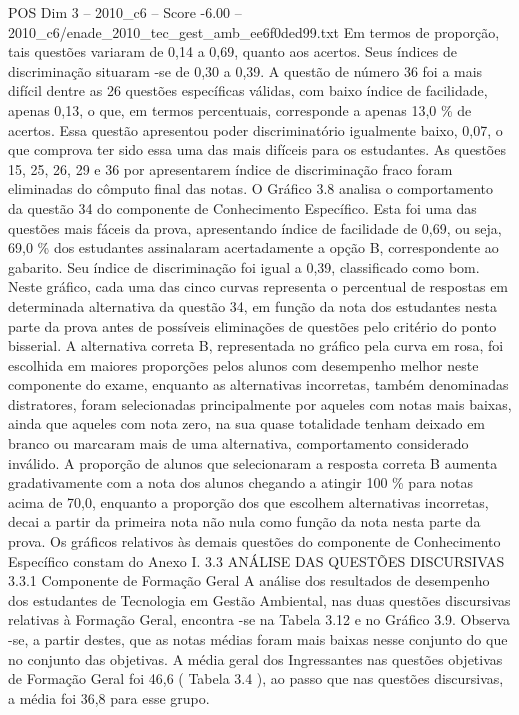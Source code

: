 \begin{textsample}{POS Dim 3 – 2010\_c6 – Score -6.00 – 2010\_c6/enade\_2010\_tec\_gest\_amb\_ee6f0ded99.txt}
Em termos de proporção, tais questões variaram de 0,14 a 0,69, quanto aos acertos.
Seus índices de discriminação situaram -se de 0,30 a 0,39.
A questão de número 36 foi a mais difícil dentre as 26 questões específicas válidas, com baixo índice de facilidade, apenas 0,13, o que, em termos percentuais, corresponde a apenas 13,0 \% de acertos.
Essa questão apresentou poder discriminatório igualmente baixo, 0,07, o que comprova ter sido essa uma das mais difíceis para os estudantes.
As questões 15, 25, 26, 29 e 36 por apresentarem índice de discriminação fraco foram eliminadas do cômputo final das notas.
O Gráfico 3.8 analisa o comportamento da questão 34 do componente de Conhecimento Específico.
Esta foi uma das questões mais fáceis da prova, apresentando índice de facilidade de 0,69, ou seja, 69,0 \% dos estudantes assinalaram acertadamente a opção B, correspondente ao gabarito.
Seu índice de discriminação foi igual a 0,39, classificado como bom.
Neste gráfico, cada uma das cinco curvas representa o percentual de respostas em determinada alternativa da questão 34, em função da nota dos estudantes nesta parte da prova antes de possíveis eliminações de questões pelo critério do ponto bisserial.
A alternativa correta B, representada no gráfico pela curva em rosa, foi escolhida em maiores proporções pelos alunos com desempenho melhor neste componente do exame, enquanto as alternativas incorretas, também denominadas distratores, foram selecionadas principalmente por aqueles com notas mais baixas, ainda que aqueles com nota zero, na sua quase totalidade tenham deixado em branco ou marcaram mais de uma alternativa, comportamento considerado inválido.
A proporção de alunos que selecionaram a resposta correta B aumenta gradativamente com a nota dos alunos chegando a atingir 100 \% para notas acima de 70,0, enquanto a proporção dos que escolhem alternativas incorretas, decai a partir da primeira nota não nula como função da nota nesta parte da prova.
Os gráficos relativos às demais questões do componente de Conhecimento Específico constam do Anexo I. 3.3 ANÁLISE DAS QUESTÕES DISCURSIVAS 3.3.1 Componente de Formação Geral A análise dos resultados de desempenho dos estudantes de Tecnologia em Gestão Ambiental, nas duas questões discursivas relativas à Formação Geral, encontra -se na Tabela 3.12 e no Gráfico 3.9.
Observa -se, a partir destes, que as notas médias foram mais baixas nesse conjunto do que no conjunto das objetivas.
A média geral dos Ingressantes nas questões objetivas de Formação Geral foi 46,6 ( Tabela 3.4 ), ao passo que nas questões discursivas, a média foi 36,8 para esse grupo.

\end{textsample}
